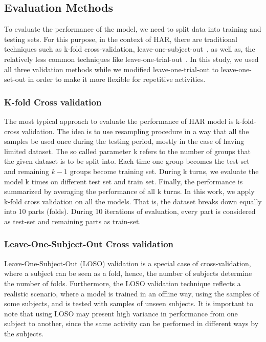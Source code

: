 \documentclass[journal,article,submit,moreauthors,pdftex]{Definitions/mdpi}
\newcommand{\diego}[1]{\textcolor{gray}{{\it [Diego: #1]}}}
\begin{document}
\subsection{Evaluation Methods}
To evaluate the performance of the model, we need to split data into training and testing sets. For this purpose, in the context of HAR, there are traditional techniques such as k-fold cross-validation, leave-one-subject-out~\cite{jordao2018human}, as well as, the relatively less common techniques like leave-one-trial-out~\cite{sena2018multiscale}. In this study, we used all three validation methods while we modified leave-one-trial-out to leave-one-set-out in order to make it more flexible for repetitive activities. 

\subsubsection{K-fold Cross validation}
The most typical approach to evaluate the performance of HAR model is k-fold-cross validation. The idea is to use resampling procedure in a way that all the samples be used once during the testing period, mostly in the case of having limited dataset. The so called parameter k refers to the number of groups that the given dataset is to be split into. Each time one group becomes the test set and remaining $k-1$ groups become training set. During k turns, we evaluate the model k times on different test set and train set. Finally, the performance is summarized by averaging the performance of all k turns. In this work, we apply k-fold cross validation on all the models. That is, the dataset breaks down equally into 10 parts (folds). During 10 iterations of evaluation, every part is considered as test-set and remaining parts as train-set. 
\subsubsection{Leave-One-Subject-Out Cross validation}
Leave-One-Subject-Out (LOSO) validation is a special case of cross-validation, where a subject can be seen as a fold, hence, the number of subjects determine the number of folds. Furthermore, the LOSO validation technique reflects a realistic scenario, where a model is trained in an offline way, using the samples of some subjects, and is tested with samples of unseen subjects. It is important to note that using LOSO may present high variance in performance from one subject to another, since the same activity can be performed in different ways by the subjects. 
\end{document}
